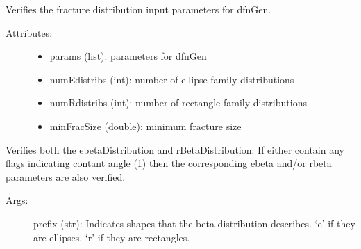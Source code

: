\documentclass[letterpaper,10pt,english]{sphinxmanual}
\begin{document}
\label{\detokenize{pydfnworks:module-pydfnworks.distributions}}

\begin{fulllineitems}
\label{\detokenize{pydfnworks:pydfnworks.distributions.distr}}
Verifies the fracture distribution input parameters for dfnGen.
\begin{description}
\item[{Attributes:}] \leavevmode\begin{itemize}
\item {} 
params (list): parameters for dfnGen

\item {} 
numEdistribs (int): number of ellipse family distributions

\item {} 
numRdistribs (int): number of rectangle family distributions

\item {} 
minFracSize (double): minimum fracture size

\end{itemize}

\end{description}

\begin{fulllineitems}
\label{\detokenize{pydfnworks:pydfnworks.distributions.distr.beta_distribution}}
Verifies both the \sphinxquotedblleft{}ebetaDistribution\sphinxquotedblright{} and \sphinxquotedblleft{}rBetaDistribution\sphinxquotedblright{}. If either contain any flags
indicating contant angle (1) then the corresponding \sphinxquotedblleft{}ebeta\sphinxquotedblright{} and/or \sphinxquotedblleft{}rbeta\sphinxquotedblright{} parameters are 
also verified.
\begin{description}
\item[{Args:}] \leavevmode
prefix (str): Indicates shapes that the beta distribution describes. `e' if they are ellipses, `r' if they are rectangles.

\end{description}

\end{fulllineitems}


\end{fulllineitems}
\end{document}
